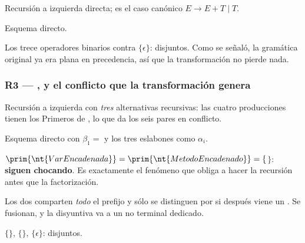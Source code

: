 Recursión a izquierda directa; es el caso canónico $E \to E + T \mid T$.

 Esquema directo.

\begin{producciones}
\end{producciones}
Los trece operadores binarios contra $\{\epsilon\}$: disjuntos. Como se señaló, la gramática
original ya era plana en precedencia, así que la transformación no pierde nada.

\subsubsection{R3 --- , y el conflicto que la transformación genera}
\label{sec:r3}

\begin{producciones}
\end{producciones}

 Recursión a izquierda con \emph{tres} alternativas recursivas: las cuatro
producciones tienen los Primeros de , lo que da los seis pares en conflicto.

 Esquema directo con $\beta_1 = $  y los tres eslabones como
$\alpha_i$.

\begin{producciones}
\end{producciones}
$\prim{\nt{VarEncadenada}} = \prim{\nt{MetodoEncadenado}} = \{$$\}$: \textbf{siguen
chocando}. Es exactamente el fenómeno que obliga a hacer la recursión antes que la factorización.

 Los dos comparten \emph{todo} el prefijo y sólo se
distinguen por si después viene un \tl{(}. Se fusionan, y la disyuntiva va a un no terminal
dedicado.
\begin{producciones}
\end{producciones}
$\{$$\}$, $\{$\tl{[}$\}$, $\{\epsilon\}$: disjuntos.

